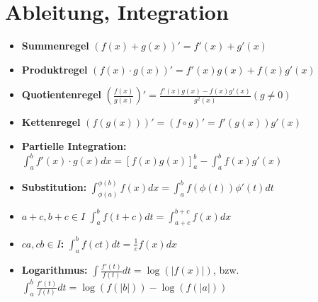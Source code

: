 

\section{Ableitung, Integration}

\begin{itemize}
	\item \textbf{Summenregel} $(f(x)+g(x))' = f'(x) + g'(x)$
	\item \textbf{Produktregel} $(f(x)\cdot g(x))' = f'(x)g(x) + f(x)g'(x)$
	\item \textbf{Quotientenregel} $\left(\frac{f(x)}{g(x)}\right)' = \frac{f'(x)g(x) - f(x)g'(x)}{g^2(x)}(g\neq 0)$
	\item \textbf{Kettenregel} $(f(g(x)))' = (f\circ g)' = f'(g(x))g'(x)$
\end{itemize}

\begin{itemize}
	\item \textbf{Partielle Integration:} $\int_a^b f'(x)\cdot g(x)dx = \left[f(x)g(x)\right]_a^b - \int_a^b f(x)g'(x)$
	\item \textbf{Substitution:} $\int_{\phi(a)}^{\phi(b)} f(x)dx = \int_a^b f(\phi(t))\phi '(t) dt$
	\item \textbf{$a+c, b+c \in I$} $\int_a^b f(t+c)dt = \int_{a+c}^{b+c} f(x)dx$
	\item \textbf{$ca,cb\in I$: } $\int_a^b f(ct)dt = \frac{1}{c}f(x)dx$
	\item \textbf{Logarithmus: }\;$\int\frac{f'(t)}{f(t)}dt = \log(|f(x)|)$, bzw. $\int_a^b\frac{f'(t)}{f(t)}dt = \log(f(|b|)) - \log(f(|a|))$
\end{itemize}



